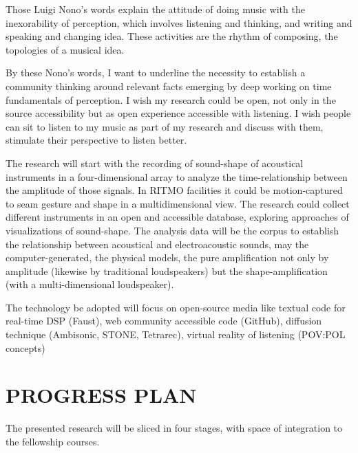 \documentclass[
	12pt,
	a4paper,
	twocolumn
	]{article}
\begin{document}
Those Luigi Nono's words explain the attitude of doing music with the inexorability of perception, which involves listening and thinking, and writing and speaking and changing idea. These activities are the rhythm of composing, the topologies of a musical idea. 

By these Nono's words, I want to underline the necessity to establish a community thinking around relevant facts emerging by deep working on time fundamentals of perception. I wish my research could be open, not only in the source accessibility but as open experience accessible with listening. I wish people can sit to listen to my music as part of my research and discuss with them, stimulate their perspective to listen better.

The research will start with the recording of sound-shape of acoustical instruments in a four-dimensional array to analyze the time-relationship between the amplitude of those signals. In RITMO facilities it could be motion-captured to seam gesture and shape in a multidimensional view. The research could collect different instruments in an open and accessible database, exploring approaches of visualizations of sound-shape. The analysis data will be the corpus to establish the relationship between acoustical and electroacoustic sounds, may the computer-generated, the physical models, the pure amplification not only by amplitude (likewise by traditional loudspeakers) but the shape-amplification (with a multi-dimensional loudspeaker). 

The technology be adopted will focus on open-source media like textual code for real-time DSP (Faust), web community accessible code (GitHub), diffusion technique (Ambisonic, STONE, Tetrarec), virtual reality of listening (POV:POL concepts)
\section*{PROGRESS PLAN}

The presented research will be sliced in four stages, with space of integration to the fellowship courses.
\end{document}
